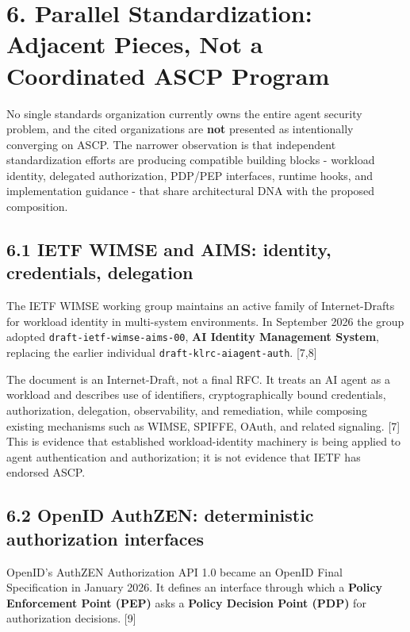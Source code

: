 \documentclass[
  10pt,
  letterpaper,
]{article}
\begin{document}
\section{6. Parallel Standardization: Adjacent Pieces, Not a Coordinated
ASCP
Program}\label{parallel-standardization-adjacent-pieces-not-a-coordinated-ascp-program}

No single standards organization currently owns the entire agent
security problem, and the cited organizations are \textbf{not} presented
as intentionally converging on ASCP. The narrower observation is that
independent standardization efforts are producing compatible building
blocks - workload identity, delegated authorization, PDP/PEP interfaces,
runtime hooks, and implementation guidance - that share architectural
DNA with the proposed composition.

\subsection{6.1 IETF WIMSE and AIMS: identity, credentials,
delegation}\label{ietf-wimse-and-aims-identity-credentials-delegation}

The IETF WIMSE working group maintains an active family of
Internet-Drafts for workload identity in multi-system environments. In
September 2026 the group adopted \texttt{draft-ietf-wimse-aims-00},
\textbf{AI Identity Management System}, replacing the earlier individual
\texttt{draft-klrc-aiagent-auth}. {[}7,8{]}

The document is an Internet-Draft, not a final RFC. It treats an AI
agent as a workload and describes use of identifiers, cryptographically
bound credentials, authorization, delegation, observability, and
remediation, while composing existing mechanisms such as WIMSE, SPIFFE,
OAuth, and related signaling. {[}7{]} This is evidence that established
workload-identity machinery is being applied to agent authentication and
authorization; it is not evidence that IETF has endorsed ASCP.

\subsection{6.2 OpenID AuthZEN: deterministic authorization
interfaces}\label{openid-authzen-deterministic-authorization-interfaces}

OpenID's AuthZEN Authorization API 1.0 became an OpenID Final
Specification in January 2026. It defines an interface through which a
\textbf{Policy Enforcement Point (PEP)} asks a \textbf{Policy Decision
Point (PDP)} for authorization decisions. {[}9{]}
\end{document}
